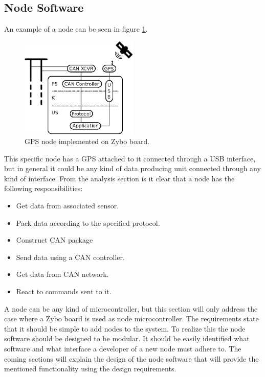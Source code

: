\subsection{Node Software}
An example of a node can be seen in figure \ref{fig:gps_node}.

\begin{figure}[!h]
\centering
\includegraphics[width=0.5\textwidth]{graphics/analysis_gps.eps}
\caption{GPS node implemented on Zybo board.}
\label{fig:gps_node}
\end{figure}

This specific node has a GPS attached to it connected through a USB interface, but in general it could be any kind of data producing unit connected through any kind of interface.
From the analysis section is it clear that a node has the following responsibilities:

\begin{itemize}
\item Get data from associated sensor.
\item Pack data according to the specified protocol.
\item Construct CAN package
\item Send data using a CAN controller.
\item Get data from CAN network.
\item React to commands sent to it.
\end{itemize}

A node can be any kind of microcontroller, but this section will only address the case where a Zybo board is used as node microcontroller. 
The requirements state that it should be simple to add nodes to the system. 
To realize this the node software should be designed to be modular.
It should be easily identified what software and what interface a developer of a new node must adhere to.
The coming sections will explain the design of the node software that will provide the mentioned functionality using the design requirements.

